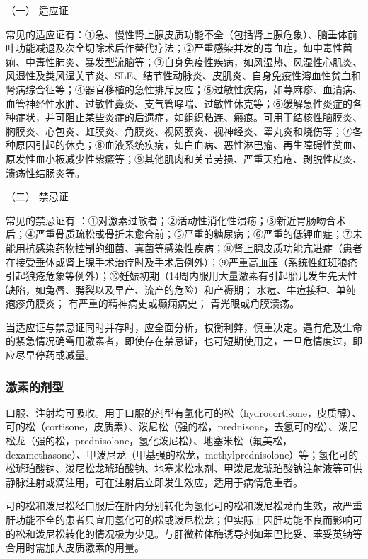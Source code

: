 \hypertarget{text00428.htmlux5cux23CHP17-6-2-1}{}
（一） 适应证

常见的适应证有：①急、慢性肾上腺皮质功能不全（包括肾上腺危象）、脑垂体前叶功能减退及次全切除术后作替代疗法；②严重感染并发的毒血症，如中毒性菌痢、中毒性肺炎、暴发型流脑等；③自身免疫性疾病，如风湿热、风湿性心肌炎、风湿性及类风湿关节炎、SLE、结节性动脉炎、皮肌炎、自身免疫性溶血性贫血和肾病综合征等；④器官移植的急性排斥反应；⑤过敏性疾病，如荨麻疹、血清病、血管神经性水肿、过敏性鼻炎、支气管哮喘、过敏性休克等；⑥缓解急性炎症的各种症状，并可阻止某些炎症的后遗症，如组织粘连、瘢痕。可用于结核性脑膜炎、胸膜炎、心包炎、虹膜炎、角膜炎、视网膜炎、视神经炎、睾丸炎和烧伤等；⑦各种原因引起的休克；⑧血液系统疾病，如白血病、恶性淋巴瘤、再生障碍性贫血、原发性血小板减少性紫癜等；⑨其他肌肉和关节劳损、严重天疱疮、剥脱性皮炎、溃疡性结肠炎等。

\hypertarget{text00428.htmlux5cux23CHP17-6-2-2}{}
（二） 禁忌证

常见的禁忌证有
：①对激素过敏者；②活动性消化性溃疡；③新近胃肠吻合术后；④严重骨质疏松或骨折未愈合前；⑤严重的糖尿病；⑥严重的低钾血症；⑦未能用抗感染药物控制的细菌、真菌等感染性疾病；⑧肾上腺皮质功能亢进症（患者在接受垂体或肾上腺手术治疗时及手术后例外）；⑨严重高血压（系统性红斑狼疮引起狼疮危象等例外）；⑩妊娠初期（14周内服用大量激素有引起胎儿发生先天性缺陷，如兔唇、腭裂以及早产、流产的危险）和产褥期；{}
水痘、牛痘接种、单纯疱疹角膜炎；{} 有严重的精神病史或癫痫病史；{}
青光眼或角膜溃疡。

当适应证与禁忌证同时并存时，应全面分析，权衡利弊，慎重决定。遇有危及生命的紧急情况确需用激素者，即使存在禁忌证，也可短期使用之，一旦危情度过，即应尽早停药或减量。

\subsubsection{激素的剂型}

口服、注射均可吸收。用于口服的剂型有氢化可的松（hydrocortisone，皮质醇）、可的松（cortisone，皮质素）、泼尼松（强的松，prednisone，去氢可的松）、泼尼松龙（强的松，prednisolone，氢化泼尼松）、地塞米松（氟美松，dexamethasone）、甲泼尼龙（甲基强的松龙，methylprednisolone）等；氢化可的松琥珀酸钠、泼尼松龙琥珀酸钠、地塞米松水剂、甲泼尼龙琥珀酸钠注射液等可供静脉注射或滴注用，可在注射后立即发生效应，适用于病情危重者。

可的松和泼尼松经口服后在肝内分别转化为氢化可的松和泼尼松龙而生效，故严重肝功能不全的患者只宜用氢化可的松或泼尼松龙；但实际上因肝功能不良而影响可的松和泼尼松转化的情况极为少见。与肝微粒体酶诱导剂如苯巴比妥、苯妥英钠等合用时需加大皮质激素的用量。

